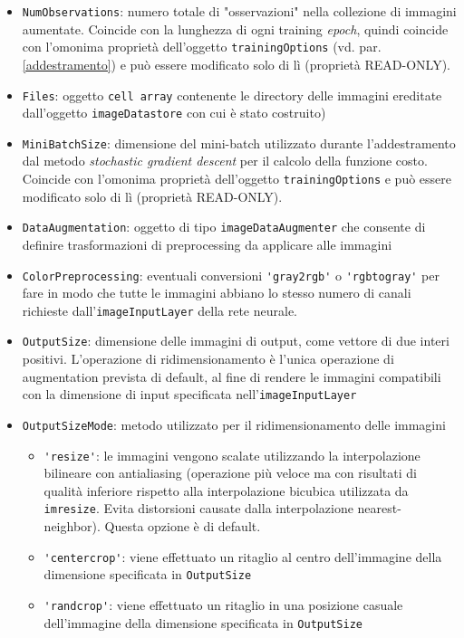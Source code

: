 \begin{itemize}

	\item \verb|NumObservations|: numero totale di "osservazioni" nella collezione di immagini aumentate. Coincide con la lunghezza di ogni training \textit{epoch}, quindi coincide con l'omonima proprietà dell'oggetto \verb|trainingOptions| (vd. par. \ref{addestramento}) e può essere modificato solo di lì (proprietà READ-ONLY).
	
	\item \verb|Files|: oggetto \verb|cell array| contenente le directory delle immagini ereditate dall'oggetto \verb|imageDatastore| con cui è stato costruito)
	
	\item \verb|MiniBatchSize|: dimensione del mini-batch utilizzato durante l'addestramento dal metodo \textit{stochastic gradient descent} per il calcolo della funzione costo. Coincide con l'omonima proprietà dell'oggetto \verb|trainingOptions| e può essere modificato solo di lì (proprietà READ-ONLY).
	
	\item \verb|DataAugmentation|: oggetto di tipo \verb|imageDataAugmenter| che consente di definire trasformazioni di preprocessing da applicare alle immagini
	
	\item \verb|ColorPreprocessing|: eventuali conversioni \verb|'gray2rgb'| o \verb|'rgbtogray'| per fare in modo che tutte le immagini abbiano lo stesso numero di canali richieste dall'\verb|imageInputLayer| della rete neurale.
	
	\item \verb|OutputSize|: dimensione delle immagini di output, come vettore di due interi positivi. L'operazione di ridimensionamento è l'unica operazione di augmentation prevista di default, al fine di rendere le immagini compatibili con la dimensione di input specificata nell'\verb|imageInputLayer|
	
	\item \verb|OutputSizeMode|: metodo utilizzato per il ridimensionamento delle immagini
	
	\begin{itemize}
		\item \verb|'resize'|: le immagini vengono scalate utilizzando la interpolazione bilineare con antialiasing (operazione più veloce ma con risultati di qualità inferiore rispetto alla interpolazione bicubica utilizzata da \verb|imresize|. Evita distorsioni causate dalla interpolazione nearest-neighbor). Questa opzione è di default.
		\item \verb|'centercrop'|: viene effettuato un ritaglio al centro dell'immagine della dimensione specificata in \verb|OutputSize|
		\item \verb|'randcrop'|: viene effettuato un ritaglio in una posizione casuale dell'immagine della dimensione specificata in \verb|OutputSize|
	\end{itemize}
\end{itemize}

